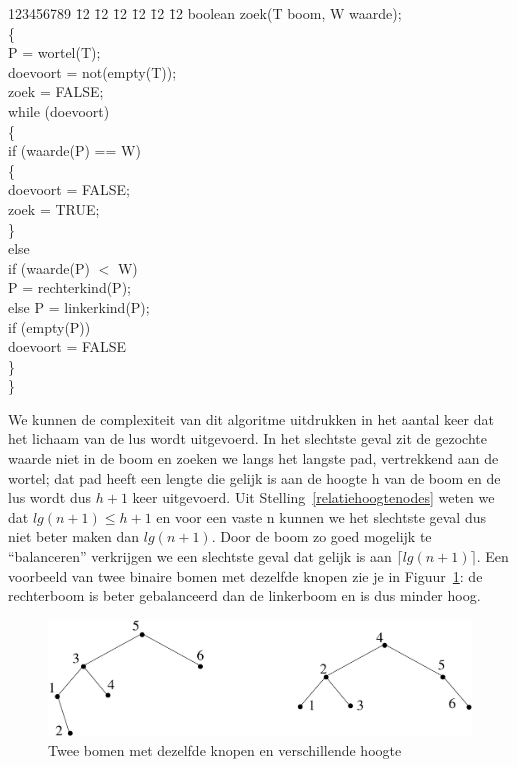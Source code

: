 \parbox{9cm}{
\begin{tabbing}
123456789 \= 12 \= 12 \= 12 \= 12 \= 12 \= 12 \kill
\> boolean zoek(T boom, W waarde);\\
\> \{\\
\> \> P = wortel(T);\\
\> \> doevoort = not(empty(T));\\
\> \> zoek = FALSE;\\
\> \> while (doevoort)\\
\> \> \{\\
\> \> \> if (waarde(P) == W)\\
\> \> \> \> \{ \\
\> \> \> \> \> doevoort = FALSE;\\
\> \> \> \> \> zoek = TRUE;\\
\> \> \> \> \}\\
\> \> \> else\\
\> \> \> if (waarde(P) $<$ W)\\
\> \> \> \> P = rechterkind(P);\\
\> \> \> else P = linkerkind(P);\\
\> \> \> if (empty(P)) \\
\> \> \> \> doevoort = FALSE\\
\> \> \}\\
\> \}
\end{tabbing}
}

We kunnen de complexiteit van dit algoritme uitdrukken in het aantal
keer dat het lichaam van de lus wordt uitgevoerd. In het slechtste
geval zit de gezochte waarde niet in de boom en zoeken we langs het
langste pad, vertrekkend aan de wortel; dat pad heeft een lengte die
gelijk is aan de hoogte h van de boom en de lus wordt dus $h+1$ keer
uitgevoerd. Uit Stelling~\ref{relatiehoogtenodes} weten we dat
$lg(n+1) \leq h+1$ en voor een vaste n kunnen we het slechtste geval
dus niet beter maken dan $lg(n+1)$. Door de boom zo goed mogelijk te
``balanceren'' verkrijgen we een slechtste geval dat gelijk is aan
$\lceil lg(n+1) \rceil$. Een voorbeeld van twee binaire bomen met
dezelfde knopen zie je in Figuur~\ref{balanced1}: de rechterboom is
beter gebalanceerd dan de linkerboom en is dus minder hoog.

\begin{figure}[ht]
\begin{center}
\includegraphics[width=0.6\linewidth,keepaspectratio]{balanced1}
\end{center}
\caption{Twee bomen met dezelfde knopen en verschillende hoogte \label{balanced1}}
\end{figure}


